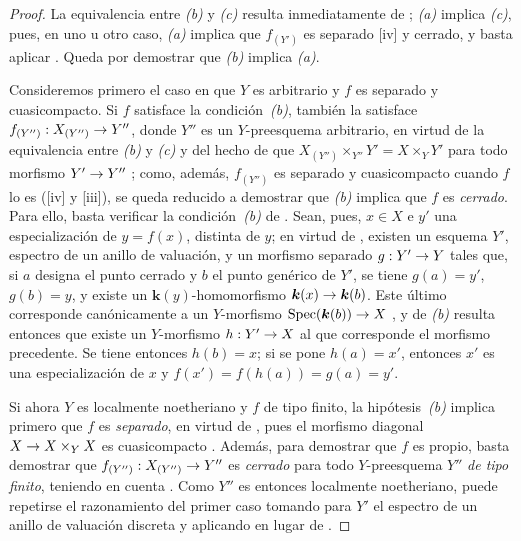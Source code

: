 \documentclass[oneside,10pt]{amsart}
\makeatletter
\newcommand{\ega@arrow}[2]{\mathchoice{#1}{#2}{#2}{#2}}
\renewcommand{\to}{\ega@arrow{\longrightarrow}{\rightarrow}}
\makeatother
\begin{document}
\begin{proof}
La equivalencia entre \emph{(b)} y \emph{(c)} resulta inmediatamente de ;
\emph{(a)} implica \emph{(c)}, pues, en uno u otro caso, \emph{(a)} implica que $f_{(Y')}$ es separado [iv] y cerrado, y basta aplicar .
Queda por demostrar que \emph{(b)} implica \emph{(a)}.

Consideremos primero el caso en que $Y$ es arbitrario y $f$ es separado y cuasicompacto.
Si $f$ satisface la condición~\emph{(b)}, también la satisface
$f_{(Y'')}:X_{(Y'')}\to Y''$,
donde $Y''$ es un $Y$-preesquema arbitrario, en virtud de la equivalencia entre \emph{(b)} y \emph{(c)} y del hecho de que
$X_{(Y'')}\times_{Y''}Y'=X\times_YY'$
para todo morfismo $Y'\to Y''$ ;
como, además, $f_{(Y'')}$ es separado y cuasicompacto cuando $f$ lo es ([iv] y [iii]), se queda reducido a demostrar que \emph{(b)} implica que $f$ es \emph{cerrado}.
Para ello, basta verificar la condición~\emph{(b)} de .
Sean, pues, $x\in X$ e $y'$ una especialización de $y=f(x)$, distinta de $y$;
en virtud de , existen un esquema $Y'$, espectro de un anillo de valuación, y un morfismo separado $g:Y'\to Y$ tales que, si $a$ designa el punto cerrado y $b$ el punto genérico de $Y'$, se tiene $g(a)=y'$, $g(b)=y$, y existe un $\boldsymbol{k}(y)$-homomorfismo $\boldsymbol{k}(x)\to \boldsymbol{k}(b)$.
Este último corresponde canónicamente a un $Y$-morfismo
$\operatorname{Spec}(\boldsymbol{k}(b))\to X$
, y de \emph{(b)} resulta entonces que existe un $Y$-morfismo $h:Y'\to X$ al que corresponde el morfismo precedente.
Se tiene entonces $h(b)=x$;
si se pone $h(a)=x'$, entonces $x'$ es una especialización de $x$ y
$f(x')=f(h(a))=g(a)=y'$.

Si ahora $Y$ es localmente noetheriano y $f$ de tipo finito, la hipótesis~\emph{(b)} implica primero que $f$ es \emph{separado}, en virtud de , pues el morfismo diagonal $X\to X\times_YX$ es cuasicompacto .
Además, para demostrar que $f$ es propio, basta demostrar que
$f_{(Y'')}:X_{(Y'')}\to Y''$
es \emph{cerrado} para todo $Y$-preesquema $Y''$ \emph{de tipo finito}, teniendo en cuenta .
Como $Y''$ es entonces localmente noetheriano, puede repetirse el razonamiento del primer caso tomando para $Y'$ el espectro de un anillo de valuación discreta y aplicando  en lugar de .
\end{proof}
\end{document}
